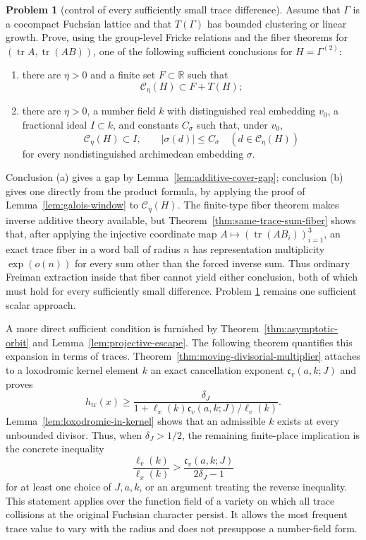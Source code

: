 \documentclass[11pt,reqno]{amsart}
\theoremstyle{definition}
\newtheorem{problem}[theorem]{Problem}
\theoremstyle{remark}
\newcommand{\R}{\mathbb R}
\newcommand{\Tr}{\operatorname{tr}}
\begin{document}
\begin{problem}[control of every sufficiently small trace difference]
\label{prob:propagation}
Assume that \(\Gamma\) is a cocompact Fuchsian lattice and that
\(T(\Gamma)\) has bounded clustering or linear growth.  Prove, using the
group-level Fricke relations and the fiber theorems for
\((\Tr A,\Tr(AB))\), one of the
following sufficient conclusions for \(H=\Gamma^{(2)}\):
\begin{enumerate}[label=\textup{(\alph*)}]
\item there are \(\eta>0\) and a finite set \(F\subset\R\) such that
\[
 \mathcal C_\eta(H)\subset F+T(H);
\]
\item there are \(\eta>0\), a number field \(k\) with distinguished real
embedding \(v_0\), a fractional ideal \(I\subset k\), and constants
\(C_\sigma\) such that, under \(v_0\),
\[
 \mathcal C_\eta(H)\subset I,
 \qquad |\sigma(d)|\le C_\sigma
 \quad(d\in\mathcal C_\eta(H))
\]
for every nondistinguished archimedean embedding \(\sigma\).
\end{enumerate}
\end{problem}

Conclusion (a) gives a gap by Lemma~\ref{lem:additive-cover-gap}; conclusion
(b) gives one directly from the product formula, by applying the proof of
Lemma~\ref{lem:galois-window} to \(\mathcal C_\eta(H)\).  The finite-type
fiber theorem makes inverse additive theory available, but
Theorem~\ref{thm:same-trace-sum-fiber} shows that, after applying the
injective coordinate map \(A\mapsto(\Tr(AB_i))_{i=1}^3\), an exact trace
fiber in a word ball of radius \(n\) has representation multiplicity
\(\exp(o(n))\) for every sum other than the forced inverse sum.  Thus
ordinary Freiman extraction inside that fiber cannot yield either conclusion, both of which
must hold for every sufficiently small difference.  Problem
\ref{prob:propagation} remains one sufficient scalar approach.

A more direct sufficient condition is furnished by
Theorem~\ref{thm:asymptotic-orbit} and
Lemma~\ref{lem:projective-escape}.  The following theorem quantifies this
expansion in terms of traces.
Theorem~\ref{thm:moving-divisorial-multiplier} attaches to a loxodromic
kernel element \(k\) an exact cancellation exponent
\(\mathfrak c_v(a,k;J)\) and proves
\[
 h_{\Tr}(x)\ge
 \frac{\delta_J}
 {1+\ell_x(k)\mathfrak c_v(a,k;J)/\ell_v(k)}.
\]
Lemma~\ref{lem:loxodromic-in-kernel} shows that an admissible \(k\) exists
at every unbounded divisor.  Thus, when \(\delta_J>1/2\), the remaining
finite-place implication is the concrete inequality
\[
 \frac{\ell_v(k)}{\ell_x(k)}>
 \frac{\mathfrak c_v(a,k;J)}{2\delta_J-1}
\]
for at least one choice of \(J,a,k\), or an argument treating the reverse
inequality.  This statement applies over the
function field of a variety on which all trace collisions at the original
Fuchsian character persist.  It allows the most frequent trace value to
vary with the radius and does not presuppose a number-field form.
\end{document}
